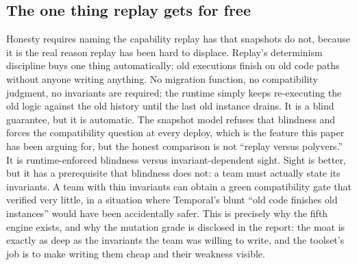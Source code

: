 \documentclass[11pt]{article}
\newcommand{\tool}[1]{\textsf{#1}}
\begin{document}
\subsection{The one thing replay gets for free}

Honesty requires naming the capability replay has that snapshots do not, because
it is the real reason replay has been hard to displace. Replay's determinism
discipline buys one thing automatically: old executions finish on old code paths
without anyone writing anything. No migration function, no compatibility
judgment, no invariants are required; the runtime simply keeps re-executing the
old logic against the old history until the last old instance drains. It is a
blind guarantee, but it is automatic. The snapshot model refuses that blindness
and forces the compatibility question at every deploy, which is the feature this
paper has been arguing for, but the honest comparison is not ``replay versus
\tool{polyvers}.'' It is runtime-enforced blindness versus invariant-dependent
sight. Sight is better, but it has a prerequisite that blindness does not: a team
must actually state its invariants. A team with thin invariants can obtain a green
compatibility gate that verified very little, in a situation where Temporal's
blunt ``old code finishes old instances'' would have been accidentally safer. This
is precisely why the fifth engine exists, and why the mutation grade is disclosed
in the report: the moat is exactly as deep as the invariants the team was willing
to write, and the toolset's job is to make writing them cheap and their weakness
visible.
\end{document}

